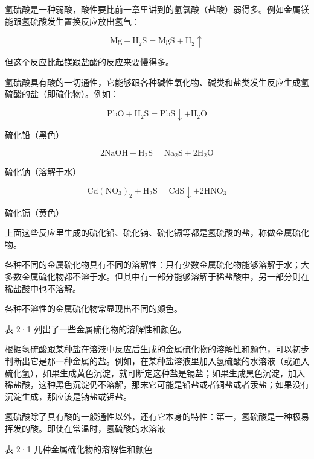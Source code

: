 氢硫酸是一种弱酸，酸性要比前一章里讲到的氢氯酸（盐酸）弱得多。例如金属镁能跟氢硫酸发生置换反应放出氢气：

\[
\mathrm{Mg} + \mathrm{H} _ {2} \mathrm{S} = \mathrm{MgS} + \mathrm{H} _ {2} \uparrow
\]

但这个反应比起镁跟盐酸的反应来要慢得多。

氢硫酸具有酸的一切通性，它能够跟各种碱性氧化物、碱类和盐类发生反应生成氢硫酸的盐（即硫化物）。例如：

\[
\mathrm{PbO} + \mathrm{H} _ {2} \mathrm{S} = \mathrm{PbS} \downarrow + \mathrm{H} _ {2} \mathrm{O}
\]

硫化铅（黑色）

\[
2 \mathrm{NaOH} + \mathrm{H} _ {2} \mathrm{S} = \mathrm{Na} _ {2} \mathrm{S} + 2 \mathrm{H} _ {2} \mathrm{O}
\]

硫化钠（溶解于水）

\[
\mathrm{Cd} \left(\mathrm{NO} _ {3}\right) _ {2} + \mathrm{H} _ {2} \mathrm{S} = \mathrm{CdS} \downarrow + 2 \mathrm{HNO} _ {3}
\]

硫化镉（黄色）

上面这些反应里生成的硫化铅、硫化钠、硫化镉等都是氢硫酸的盐，称做金属硫化物。

各种不同的金属硫化物具有不同的溶解性：只有少数金属硫化物能够溶解于水；大多数金属硫化物都不溶于水。但其中有一部分能够溶解于稀盐酸中，另一部分则在稀盐酸中也不溶解。

各种不溶性的金属硫化物常显现出不同的颜色。

表 2·1 列出了一些金属硫化物的溶解性和颜色。

根据氢硫酸跟某种盐在溶液中反应后生成的金属硫化物的溶解性和颜色，可以初步判断出它是那一种金属的盐。例如，在某种盐溶液里加入氢硫酸的水溶液（或通入硫化氢），如果生成黄色沉淀，就可断定这种盐是镉盐；如果生成黑色沉淀，加入稀盐酸，这种黑色沉淀仍不溶解，那末它可能是铅盐或者铜盐或者汞盐；如果没有沉淀生成，那应该是钠盐或钾盐。

氢硫酸除了具有酸的一般通性以外，还有它本身的特性：第一，氢硫酸是一种极易挥发的酸。即使在常温时，氢硫酸的水溶液

表 2·1 几种金属硫化物的溶解性和颜色

